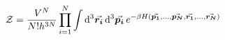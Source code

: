 

\vspace*{\fill}
\centering

\begin{align*}
    \mathcal{Z} = \frac{V^{N}}{N! h^{3N}} \prod_{i=1}^{N} \int \dd[3]{\va*{r_{i}}}\dd[3]{\va*{p_{i}}} e^{-\beta H(\va*{p_{1}},\ldots,\va*{p_{N}},\va*{r_{1}},\ldots,\va*{r_{N}})}
\end{align*}

\centering
\vspace*{\fill}

